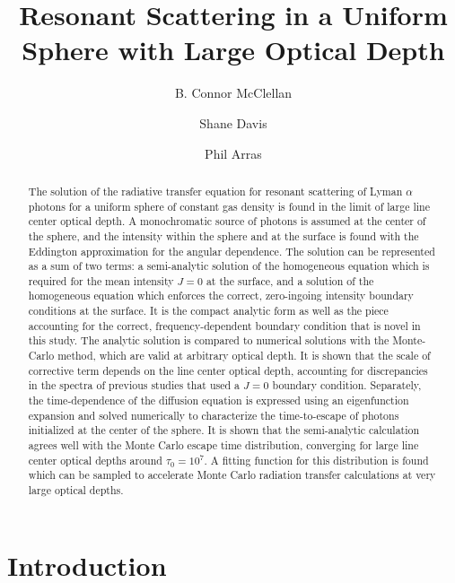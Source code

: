 \documentclass{aastex63}
\begin{document}
\title{Resonant Scattering in a Uniform Sphere with Large Optical Depth}




\author{B. Connor McClellan}
\author{Shane Davis}
\author{Phil Arras}


\begin{abstract}

The solution of the radiative transfer equation for resonant scattering of Lyman $\alpha$ photons for a uniform sphere of constant gas density is found in the limit of large line center optical depth. A monochromatic source of photons is assumed at the center of the sphere, and the intensity within the sphere and at the surface is found with the Eddington approximation for the angular dependence. The solution can be represented as a sum of two terms: a semi-analytic solution of the homogeneous equation which is required for the mean intensity $J=0$ at the surface, and a solution of the homogeneous equation which enforces the correct, zero-ingoing intensity boundary conditions at the surface. It is the compact analytic form as well as the piece accounting for the correct, frequency-dependent boundary condition that is novel in this study. The analytic solution is compared to numerical solutions with the Monte-Carlo method, which are valid at arbitrary optical depth. It is shown that the scale of corrective term depends on the line center optical depth, accounting for discrepancies in the spectra of previous studies that used a $J=0$ boundary condition. Separately, the time-dependence of the diffusion equation is expressed using an eigenfunction expansion and solved numerically to characterize the time-to-escape of photons initialized at the center of the sphere. It is shown that the semi-analytic calculation agrees well with the Monte Carlo escape time distribution, converging for large line center optical depths around $\tau_0=10^7$. A fitting function for this distribution is found which can be sampled to accelerate Monte Carlo radiation transfer calculations at very large optical depths.

\end{abstract}


\keywords{}

\section{Introduction} 
\label{sec:intro}
\end{document}
